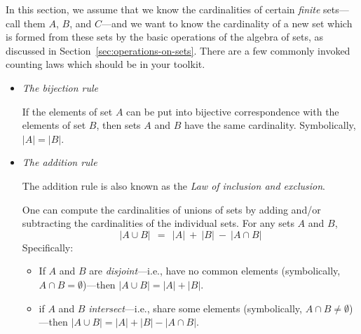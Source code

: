 In this section, we assume that we know the cardinalities of certain {\em finite} sets---call
them $A$, $B$, and $C$---and we want to know the cardinality of a new set which is formed
from these sets by the basic operations of the algebra of sets, as discussed in
Section~\ref{sec:operations-on-sets}.  There are a few commonly invoked counting laws
which should be in your toolkit.
\begin{itemize}
\item
{\it The bijection rule} 

\smallskip

If the elements of set $A$ can be put into bijective correspondence with the elements of set
$B$, then sets $A$ and $B$ have the same cardinality.  Symbolically, $|A| = |B|$.

\medskip\item
{\it The addition rule} 

The addition rule is also known as the {\it Law of inclusion and exclusion}.

\smallskip

One can compute the cardinalities of unions of sets by adding and/or subtracting
the cardinalities of the individual sets.  For any sets $A$ and $B$,
\[ |A \cup B| \ \ = \ \ |A|  \ + \ |B| \ - \ |A \cap B| \]
Specifically:
  \begin{itemize}
  \item
If $A$ and $B$ are {\em disjoint}---i.e., have no common elements (symbolically, $A \cap B = \emptyset$)---then $|A \cup B| = |A| + |B|$.

 \medskip\item
if $A$ and $B$ {\em intersect}---i.e., share some elements (symbolically, $A \cap B \neq \emptyset$)---then $|A \cup B|  =  |A|  + |B| - |A \cap B|$.

\smallskip


\end{itemize}
\end{itemize}
